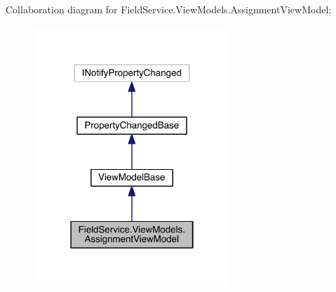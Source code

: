 Collaboration diagram for Field\+Service.\+View\+Models.\+Assignment\+View\+Model\+:
\nopagebreak
\begin{figure}[H]
\begin{center}
\leavevmode
\includegraphics[width=210pt]{class_field_service_1_1_view_models_1_1_assignment_view_model__coll__graph}
\end{center}
\end{figure}

